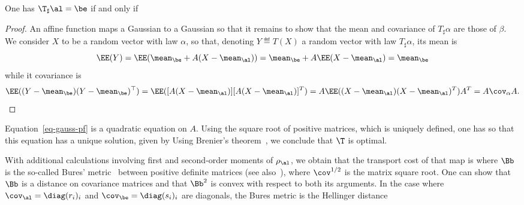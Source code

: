 \begin{prop}
One has $\T_\sharp \al=\be$ if and only if 
\end{prop}

\begin{proof}
An affine function maps a Gaussian to a Gaussian so that it remains to show that the mean and covariance of $T_\sharp \alpha$ are those of $\beta$. We consider $X$ to be a random vector with law $\alpha$, so that, denoting $Y \eqdef T(X)$ a random vector with law $T_\sharp \alpha$, its mean is 
$$
	\EE(Y) = \EE( \mean_\be + A(X-\mean_\al) )	= \mean_\be + A \EE(X-\mean_\al) =  \mean_\be
$$
while it covariance is
$$
	\EE( (Y-\mean_\be) (Y-\mean_\be)^\top ) = \EE( [A(X-\mean_\al)] [ A(X-\mean_\al) ]^T ) = A \EE( (X-\mean_\al)(X-\mean_\al) ^T ) A^T
	= A \cov_\alpha A. 
$$
\end{proof}

Equation~\eqref{eq-gauss-pf} is a quadratic equation on $A$. Using the square root of positive matrices, which is uniquely defined, one has 
so that this equation has a unique solution, given by
Using Brenier's theorem~\cite{Brenier91}, we conclude that $\T$ is optimal. 
 
With additional calculations involving first and second-order moments of $\rho_\al$, we obtain that the transport cost of that map is
where $\Bb$ is the so-called Bures' metric~\cite{bures1969extension} between positive definite matrices (see also~\cite{forrester2016relating}),
where $\cov^{1/2}$ is the matrix square root. One can show that $\Bb$ is a distance on covariance matrices and that $\Bb^2$ is convex with respect to both its arguments. 
%
In the case where $\cov_\al = \diag(r_i)_i$ and $\cov_\be = \diag(s_i)_i$ are diagonals, the Bures metric is the Hellinger distance
